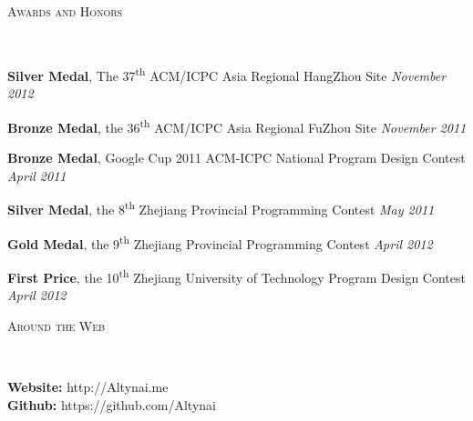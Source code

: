 ﻿\documentclass[9pt]{article}
\newenvironment{changemargin}[2]{%
  \begin{list}{}{%
    \setlength{\topsep}{0pt}%
    \setlength{\leftmargin}{#1}%
    \setlength{\rightmargin}{#2}%
    \setlength{\listparindent}{\parindent}%
    \setlength{\itemindent}{\parindent}%
    \setlength{\parsep}{\parskip}%
  }%
  \item[]}{\end{list}
}
\newcommand{\lineover}{
	\begin{changemargin}{-0.05in}{-0.05in}
		\vspace*{-8pt}
		\hrulefill \\
		\vspace*{-2pt}
	\end{changemargin}
}
\newcommand{\header}[1]{
	\begin{changemargin}{-0.5in}{-0.5in}
		\scshape{#1}\\
  	\lineover
	\end{changemargin}
}
\newenvironment{body} {
	\vspace*{-16pt}
	\begin{changemargin}{-0.25in}{-0.5in}
  }	
	{\end{changemargin}
}
\newcommand\nth{\textsuperscript{th}} %
\begin{document}
\smallskip

\header{Awards and Honors}

\begin{body}
	\vspace{14pt}

	\textbf{Silver Medal}, The 37\nth{} ACM/ICPC Asia Regional HangZhou Site \hfill{} \emph{November 2012}\\
	\smallskip

	\textbf{Bronze Medal}, the 36\nth{} ACM/ICPC Asia Regional FuZhou Site \hfill{} \emph{November 2011}\\
	\smallskip

	\textbf{Bronze Medal}, Google Cup 2011 ACM-ICPC National Program Design Contest \hfill{} \emph{April 2011}\\
	\smallskip

	\textbf{Silver Medal}, the 8\nth{} Zhejiang Provincial Programming Contest \hfill{} \emph{May 2011}\\
	\smallskip

	\textbf{Gold Medal}, the 9\nth{} Zhejiang Provincial Programming Contest \hfill{} \emph{April 2012}\\
	\smallskip

	\textbf{First Price}, the 10\nth{} Zhejiang University of Technology Program Design Contest \hfill{} \emph{April 2012}\\
\end{body}

\smallskip

\header{Around the Web}

\begin{body}
	\vspace{14pt}
    \textbf{Website:} http://Altynai.me \\
    \textbf{Github:} https://github.com/Altynai \\
\end{body}
\end{document}
